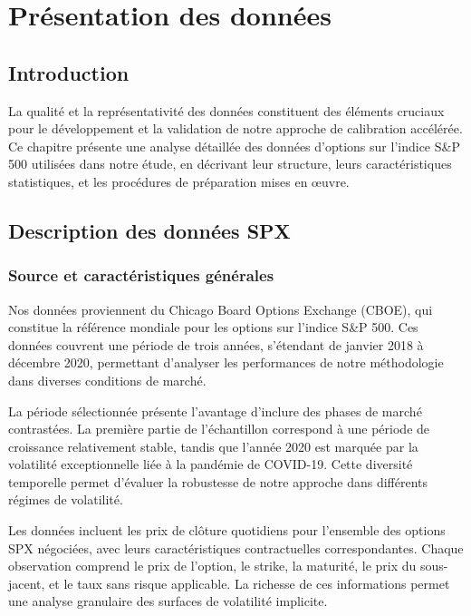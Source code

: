 \chapter{Présentation des données}

\section{Introduction}

La qualité et la représentativité des données constituent des éléments cruciaux pour le développement et la validation de notre approche de calibration accélérée. Ce chapitre présente une analyse détaillée des données d'options sur l'indice S\&P 500 utilisées dans notre étude, en décrivant leur structure, leurs caractéristiques statistiques, et les procédures de préparation mises en œuvre.

\section{Description des données SPX}

\subsection{Source et caractéristiques générales}

Nos données proviennent du Chicago Board Options Exchange (CBOE), qui constitue la référence mondiale pour les options sur l'indice S\&P 500. Ces données couvrent une période de trois années, s'étendant de janvier 2018 à décembre 2020, permettant d'analyser les performances de notre méthodologie dans diverses conditions de marché.

La période sélectionnée présente l'avantage d'inclure des phases de marché contrastées. La première partie de l'échantillon correspond à une période de croissance relativement stable, tandis que l'année 2020 est marquée par la volatilité exceptionnelle liée à la pandémie de COVID-19. Cette diversité temporelle permet d'évaluer la robustesse de notre approche dans différents régimes de volatilité.

Les données incluent les prix de clôture quotidiens pour l'ensemble des options SPX négociées, avec leurs caractéristiques contractuelles correspondantes. Chaque observation comprend le prix de l'option, le strike, la maturité, le prix du sous-jacent, et le taux sans risque applicable. La richesse de ces informations permet une analyse granulaire des surfaces de volatilité implicite.

